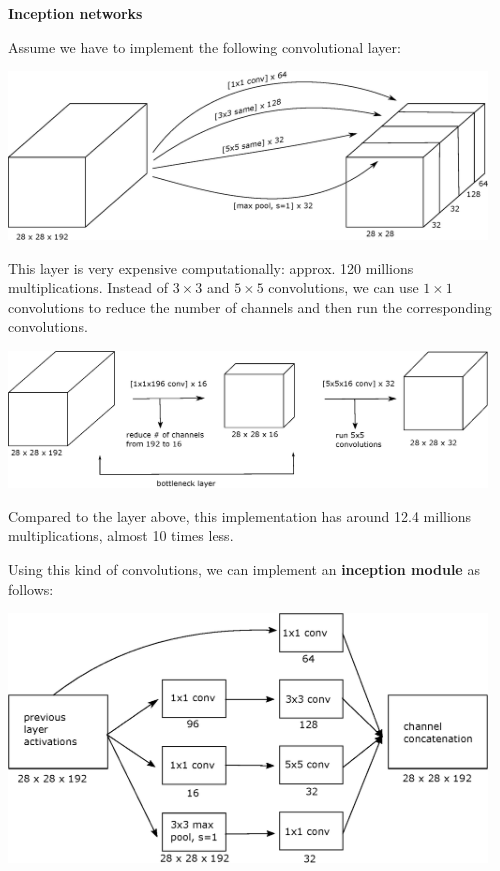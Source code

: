 \documentclass[a4paper,11pt]{report}
\begin{document}
\textbf{Inception networks}

Assume we have to implement the following convolutional layer:

\begin{center}
\includegraphics[width = 5in]{convolutions/inception1}
\end{center}

This layer is very expensive computationally: approx. 120 millions multiplications. Instead of $3\times 3$ and $5\times 5$ convolutions, we can use $1\times 1$ convolutions to reduce the number of channels and then run the corresponding convolutions.

\begin{center}
\includegraphics[width = 5in]{convolutions/bottleneck}
\end{center}

Compared to the layer above, this implementation has around 12.4 millions multiplications, almost 10 times less.

Using this kind of convolutions, we can implement an \textbf{inception module} as follows:

\begin{center}
\includegraphics[width = 5in]{convolutions/inception_module}
\end{center}
\end{document}
